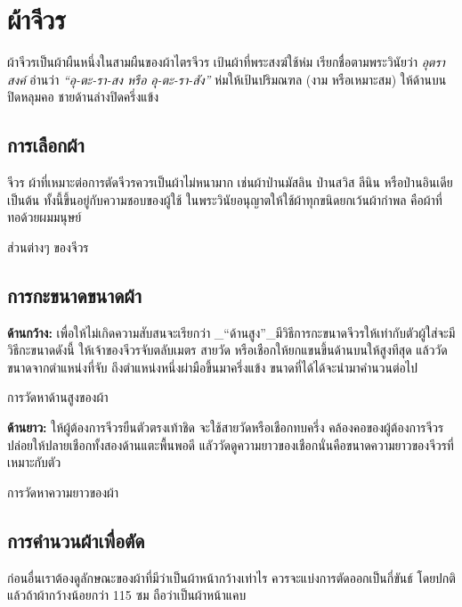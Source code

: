 \chapter{ผ้าจีวร}

ผ้าจีวรเป็นผ้าผืนหนึ่งในสามผืนของผ้าไตรจีวร เป้นผ้าที่พระสงฆ์ใช้ห่ม
เรียกชื่อตามพระวินัยว่า \emph{อุตราสงค์} อ่านว่า \emph{``อุ-ตะ-รา-สง
หรือ อุ-ตะ-รา-สัง''} ห่มให้เป้นปริมณฑล (งาม หรือเหมาะสม)
ให้ด้านบนปิดหลุมคอ ชายด้านล่างปิดครึ่งแข้ง

\section{การเลือกผ้า}

จีวร ผ้าที่เหมาะต่อการตัดจีวรควรเป็นผ้าไม่หนามาก เช่นผ้าป่านมัสลิน
ป่านสวิส ลีนิน หรือป่านอินเดียเป็นต้น ทั้งนี้ขึ้นอยู่กับความชอบของผู้ใช้
ในพระวินัยอนุญาตให้ใช้ผ้าทุกขนิดยกเว้นผ้ากำพล คือผ้าที่ทอด้วยผมมนุษย์


ส่วนต่างๆ ของจีวร

\section{การกะขนาดขนาดผ้า}

\textbf{ด้านกว้าง:} เพื่อให้ไม่เกิดความสับสนจะเรียกว่า
\_``ด้านสูง''\_มีวิธีการกะขนาดจีวรให้เท่ากับตัวผู้ใส่จะมีวิธีกะขนาดดังนี้
ให้เจ้าของจีวรจับตลับเมตร สายวัด หรือเชือกให้ยกแขนขึ้นด้านบนให้สูงทีสุด
แล้ววัดขนาดจากตำแหน่งที่จับ ถึงตำแหน่งหนึ่งผ่ามือขึ้นมาครึ่งแข้ง
ขนาดที่ได้ได้จะนำมาคำนวนต่อไป


การวัดหาด้านสูงของผ้า

\textbf{ด้านยาว:} ให้ผู้ต้องการจีวรยืนตัวตรงเท้าชิด
จะใช้สายวัดหรือเชือกทบครึ่ง คล้องคอของผู้ต้องการจีวร
ปล่อยให้ปลายเชือกทั้งสองด้านแตะพื้นพอดี
แลัววัดดูความยาวของเชือกนั่นคือขนาดความยาวของจีวรที่เหมาะกับตัว


การวัดหาความยาวของผ้า

\section{การคำนวนผ้าเพื่อตัด}

ก่อนอื่นเราต้องดูลักษณะของผ้าที่มีว่าเป็นผ้าหน้ากว้างเท่าไร
ควรจะแบ่งการตัดออกเป็นกี่ขันธ์ โดยปกติแล้วถ้าผ้ากว้างน้อยกว่า 115 ซม
ถือว่าเป็นผ้าหน้าแคบ

